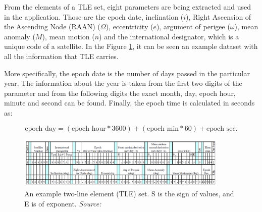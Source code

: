 From the elements of a TLE set, eight parameters are being extracted and used in the application. Those are the epoch date, inclination ($i$), Right Ascension of the Ascending Node (RAAN) ($\Omega$), eccentricity ($e$), argument of perigee ($\omega$), mean anomaly ($M$), mean motion ($n$) and the international designator, which is a unique code of a satellite. In the Figure \ref{tle}, it can be seen an example dataset with all the information that TLE carries.

More specifically, the epoch date is the number of days passed in the particular year. The information about the year is taken from the first two digits of the parameter and from the following digits the exact month, day, epoch hour, minute and second can be found. Finally, the epoch time is calculated in seconds as:

\begin{equation}
\label{epoch}
\text{epoch day} = (\text{epoch hour} * 3600) + (\text{epoch min} * 60) + \text{epoch sec}.
\end{equation}


\begin{figure}
\centering
\includegraphics[width=0.9\textwidth]{Images/tle.png}\caption{An example two-line element (TLE) set. S is the sign of values, and E is of exponent. \textit{Source: \cite{Vallado}}}
\label{tle} 
\end{figure}

